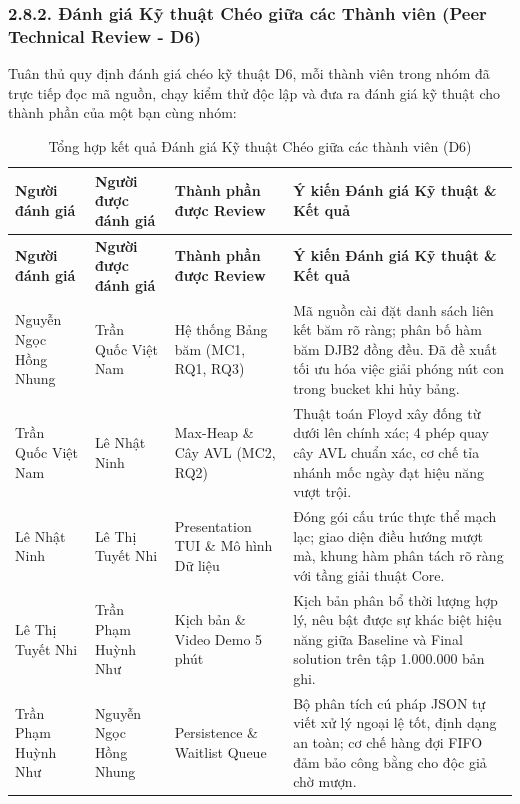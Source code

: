 \documentclass[14pt,a4paper]{extarticle}
\begin{document}
\subsubsection*{2.8.2. Đánh giá Kỹ thuật Chéo giữa các Thành viên (Peer Technical Review - D6)}

Tuân thủ quy định đánh giá chéo kỹ thuật D6, mỗi thành viên trong nhóm đã trực tiếp đọc mã nguồn, chạy kiểm thử độc lập và đưa ra đánh giá kỹ thuật cho thành phần của một bạn cùng nhóm:

\begingroup
{}
\setlength{\tabcolsep}{4pt}
\renewcommand{\arraystretch}{1.1}
\begin{xltabular}{\linewidth}{|>{\raggedright\arraybackslash}m{2.3cm}|>{\raggedright\arraybackslash}m{2.4cm}|>{\raggedright\arraybackslash}m{2.8cm}|>{\raggedright\arraybackslash}X|}
\caption{Tổng hợp kết quả Đánh giá Kỹ thuật Chéo giữa các thành viên (D6)}\label{tab:peer_review_d6} \\
\hline
\textbf{Người đánh giá} & \textbf{Người được đánh giá} & \textbf{Thành phần được Review} & \textbf{Ý kiến Đánh giá Kỹ thuật \& Kết quả} \\ \hline
\endfirsthead

\hline
\textbf{Người đánh giá} & \textbf{Người được đánh giá} & \textbf{Thành phần được Review} & \textbf{Ý kiến Đánh giá Kỹ thuật \& Kết quả} \\ \hline
\endhead

\hline
\endfoot

Nguyễn Ngọc Hồng Nhung & Trần Quốc Việt Nam & Hệ thống Bảng băm (MC1, RQ1, RQ3) & Mã nguồn cài đặt danh sách liên kết băm rõ ràng; phân bố hàm băm DJB2 đồng đều. Đã đề xuất tối ưu hóa việc giải phóng nút con trong bucket khi hủy bảng. \\ \hline
Trần Quốc Việt Nam & Lê Nhật Ninh & Max-Heap \& Cây AVL (MC2, RQ2) & Thuật toán Floyd xây đống từ dưới lên chính xác; 4 phép quay cây AVL chuẩn xác, cơ chế tỉa nhánh mốc ngày đạt hiệu năng vượt trội. \\ \hline
Lê Nhật Ninh & Lê Thị Tuyết Nhi & Presentation TUI \& Mô hình Dữ liệu & Đóng gói cấu trúc thực thể mạch lạc; giao diện điều hướng mượt mà, khung hàm phân tách rõ ràng với tầng giải thuật Core. \\ \hline
Lê Thị Tuyết Nhi & Trần Phạm Huỳnh Như & Kịch bản \& Video Demo 5 phút & Kịch bản phân bổ thời lượng hợp lý, nêu bật được sự khác biệt hiệu năng giữa Baseline và Final solution trên tập 1.000.000 bản ghi. \\ \hline
Trần Phạm Huỳnh Như & Nguyễn Ngọc Hồng Nhung & Persistence \& Waitlist Queue & Bộ phân tích cú pháp JSON tự viết xử lý ngoại lệ tốt, định dạng an toàn; cơ chế hàng đợi FIFO đảm bảo công bằng cho độc giả chờ mượn. \\ \hline
\end{xltabular}
\endgroup
\end{document}
